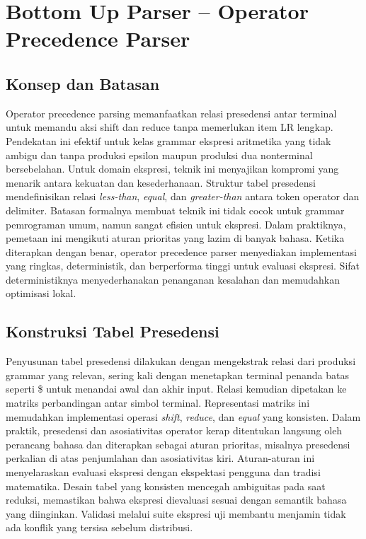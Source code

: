 \documentclass[../main.tex]{subfiles}
\begin{document}
\chapter{Bottom Up Parser – Operator Precedence Parser}
\label{ch:operator-precedence}

\section{Konsep dan Batasan}
Operator precedence parsing memanfaatkan relasi presedensi antar terminal untuk memandu aksi shift dan reduce tanpa memerlukan item LR lengkap. Pendekatan ini efektif untuk kelas grammar ekspresi aritmetika yang tidak ambigu dan tanpa produksi epsilon maupun produksi dua nonterminal bersebelahan.\cite{aho-dragon-book-2006} Untuk domain ekspresi, teknik ini menyajikan kompromi yang menarik antara kekuatan dan kesederhanaan.
Struktur tabel presedensi mendefinisikan relasi \textit{less-than}, \textit{equal}, dan \textit{greater-than} antara token operator dan delimiter. Batasan formalnya membuat teknik ini tidak cocok untuk grammar pemrograman umum, namun sangat efisien untuk ekspresi.\cite{grune-parsing} Dalam praktiknya, pemetaan ini mengikuti aturan prioritas yang lazim di banyak bahasa.
Ketika diterapkan dengan benar, operator precedence parser menyediakan implementasi yang ringkas, deterministik, dan berperforma tinggi untuk evaluasi ekspresi. Sifat deterministiknya menyederhanakan penanganan kesalahan dan memudahkan optimisasi lokal.

\section{Konstruksi Tabel Presedensi}
Penyusunan tabel presedensi dilakukan dengan mengekstrak relasi dari produksi grammar yang relevan, sering kali dengan menetapkan terminal penanda batas seperti \$ untuk menandai awal dan akhir input. Relasi kemudian dipetakan ke matriks perbandingan antar simbol terminal.\cite{aho-dragon-book-2006} Representasi matriks ini memudahkan implementasi operasi \textit{shift}, \textit{reduce}, dan \textit{equal} yang konsisten.
Dalam praktik, presedensi dan asosiativitas operator kerap ditentukan langsung oleh perancang bahasa dan diterapkan sebagai aturan prioritas, misalnya presedensi perkalian di atas penjumlahan dan asosiativitas kiri.\cite{c-spec} Aturan-aturan ini menyelaraskan evaluasi ekspresi dengan ekspektasi pengguna dan tradisi matematika.
Desain tabel yang konsisten mencegah ambiguitas pada saat reduksi, memastikan bahwa ekspresi dievaluasi sesuai dengan semantik bahasa yang diinginkan. Validasi melalui suite ekspresi uji membantu menjamin tidak ada konflik yang tersisa sebelum distribusi.

\IfSubfilesClassLoaded{%
\printbibliography
}{}
\end{document}
